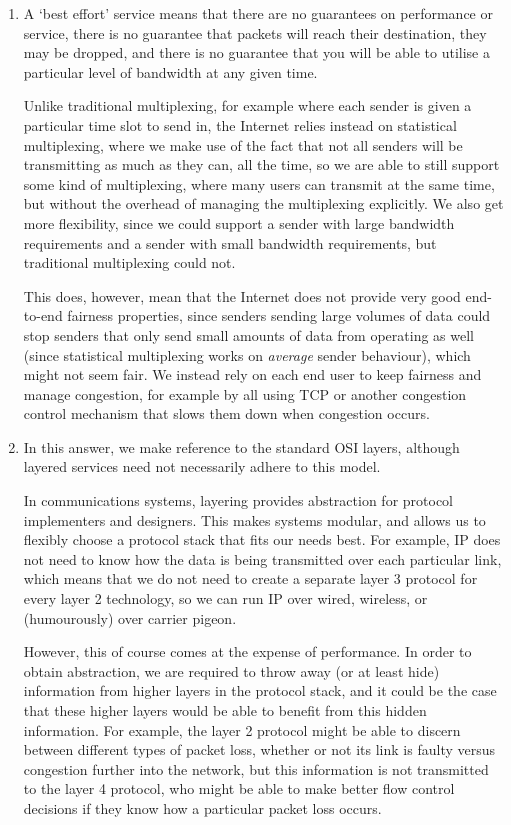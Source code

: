 


\begin{enumerate}[label=(\alph*)]
  \item
    A `best effort' service means that there are no guarantees on performance or service, there is no guarantee that packets will reach their destination, they may be dropped, and there is no guarantee that you will be able to utilise a particular level of bandwidth at any given time.

    Unlike traditional multiplexing, for example where each sender is given a particular time slot to send in, the Internet relies instead on statistical multiplexing, where we make use of the fact that not all senders will be transmitting as much as they can, all the time, so we are able to still support some kind of multiplexing, where many users can transmit at the same time, but without the overhead of managing the multiplexing explicitly. We also get more flexibility, since we could support a sender with large bandwidth requirements and a sender with small bandwidth requirements, but traditional multiplexing could not.

    This does, however, mean that the Internet does not provide very good end-to-end fairness properties, since senders sending large volumes of data could stop senders that only send small amounts of data from operating as well (since statistical multiplexing works on \textit{average} sender behaviour), which might not seem fair. We instead rely on each end user to keep fairness and manage congestion, for example by all using TCP or another congestion control mechanism that slows them down when congestion occurs.

  \item
    In this answer, we make reference to the standard OSI layers, although layered services need not necessarily adhere to this model.


    In communications systems, layering provides abstraction for protocol implementers and designers. This makes systems modular, and allows us to flexibly choose a protocol stack that fits our needs best. For example, IP does not need to know how the data is being transmitted over each particular link, which means that we do not need to create a separate layer 3 protocol for every layer 2 technology, so we can run IP over wired, wireless, or (humourously) over carrier pigeon.

    However, this of course comes at the expense of performance. In order to obtain abstraction, we are required to throw away (or at least hide) information from higher layers in the protocol stack, and it could be the case that these higher layers would be able to benefit from this hidden information. For example, the layer 2 protocol might be able to discern between different types of packet loss, whether or not its link is faulty versus congestion further into the network, but this information is not transmitted to the layer 4 protocol, who might be able to make better flow control decisions if they know how a particular packet loss occurs.
        
\end{enumerate}

